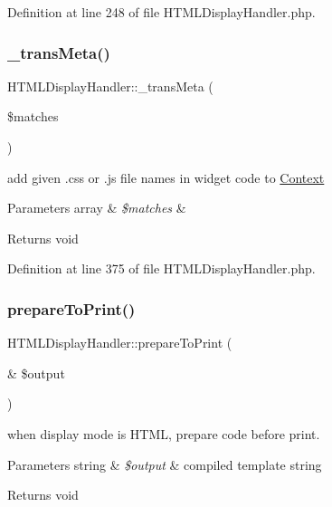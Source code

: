 Definition at line 248 of file H\+T\+M\+L\+Display\+Handler.\+php.

\hypertarget{classHTMLDisplayHandler_aa80671d70e293852abad65f4c79f5631}{}\label{classHTMLDisplayHandler_aa80671d70e293852abad65f4c79f5631} 
\subsubsection{\texorpdfstring{\+\_\+trans\+Meta()}{\_transMeta()}}
{\footnotesize\ttfamily H\+T\+M\+L\+Display\+Handler\+::\+\_\+trans\+Meta (\begin{DoxyParamCaption}\item[{}]{\$matches }\end{DoxyParamCaption})}

add given .css or .js file names in widget code to \hyperlink{classContext}{Context} 
\begin{DoxyParams}[1]{Parameters}
array & {\em \$matches} & \\
\hline
\end{DoxyParams}
\begin{DoxyReturn}{Returns}
void 
\end{DoxyReturn}


Definition at line 375 of file H\+T\+M\+L\+Display\+Handler.\+php.

\hypertarget{classHTMLDisplayHandler_a92daeef7b0da4840345986d1966ecf0c}{}\label{classHTMLDisplayHandler_a92daeef7b0da4840345986d1966ecf0c} 
\subsubsection{\texorpdfstring{prepare\+To\+Print()}{prepareToPrint()}}
{\footnotesize\ttfamily H\+T\+M\+L\+Display\+Handler\+::prepare\+To\+Print (\begin{DoxyParamCaption}\item[{\&}]{\$output }\end{DoxyParamCaption})}

when display mode is H\+T\+ML, prepare code before print. 
\begin{DoxyParams}[1]{Parameters}
string & {\em \$output} & compiled template string \\
\hline
\end{DoxyParams}
\begin{DoxyReturn}{Returns}
void 
\end{DoxyReturn}


